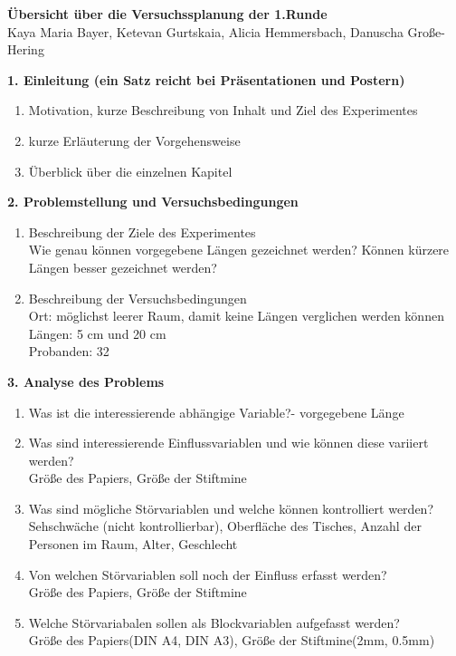 \documentclass[ ngerman, fontsize= 12pt, paper=a4, headings=big, titlepage=true]{article}
\begin{document}
	
\begin{center}
	
\textbf{\Large{ Übersicht über die Versuchssplanung der 1.Runde}} \\
	
Kaya Maria Bayer, Ketevan Gurtskaia, Alicia Hemmersbach, Danuscha Große-Hering

\end{center}

\textbf{1. Einleitung (ein Satz reicht bei Präsentationen und Postern)}
\begin{enumerate}[-]
	\item Motivation, kurze Beschreibung von Inhalt und Ziel des Experimentes
	\item kurze Erläuterung der Vorgehensweise
	\item Überblick über die einzelnen Kapitel
\end{enumerate}

\textbf{2. Problemstellung und Versuchsbedingungen}
\begin{enumerate}[-]
	\item Beschreibung der Ziele des Experimentes \\
		Wie genau können vorgegebene Längen gezeichnet werden? Können kürzere Längen besser gezeichnet werden?
	\item Beschreibung der Versuchsbedingungen\\
		Ort: möglichst leerer Raum, damit keine Längen verglichen werden können\\
		Längen: 5 cm und 20 cm\\
		Probanden: 32\\
\end{enumerate}

\textbf{3. Analyse des Problems}
\begin{enumerate}[-]
	\item Was ist die interessierende abhängige Variable?- vorgegebene Länge
	\item Was sind interessierende Einflussvariablen und wie können diese variiert werden? \\
		Größe des Papiers, Größe der Stiftmine
	\item Was sind mögliche Störvariablen und welche können kontrolliert werden?\\
		Sehschwäche (nicht kontrollierbar), Oberfläche des Tisches, Anzahl der Personen im Raum, Alter, Geschlecht 
	\item Von welchen Störvariablen soll noch der Einfluss erfasst werden? \\
		Größe des Papiers,  Größe der Stiftmine
	\item Welche Störvariabalen sollen als Blockvariablen aufgefasst werden? \\
		Größe des Papiers(DIN A4, DIN A3), Größe der Stiftmine(2mm, 0.5mm)
\end{enumerate}
\end{document}
